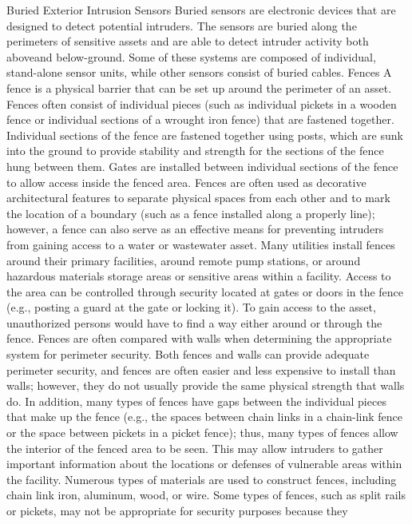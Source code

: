 \documentclass{article}
\begin{document}
Buried Exterior Intrusion Sensors Buried sensors are electronic devices
that are designed to detect potential intruders. The sensors are buried
along the perimeters of sensitive assets and are able to detect intruder
activity both aboveand below-ground. Some of these systems are composed
of individual, stand-alone sensor units, while other sensors consist of
buried cables. Fences A fence is a physical barrier that can be set up
around the perimeter of an asset. Fences often consist of individual
pieces (such as individual pickets in a wooden fence or individual
sections of a wrought iron fence) that are fastened together. Individual
sections of the fence are fastened together using posts, which are sunk
into the ground to provide stability and strength for the sections of
the fence hung between them. Gates are installed between individual
sections of the fence to allow access inside the fenced area. Fences are
often used as decorative architectural features to separate physical
spaces from each other and to mark the location of a boundary (such as a
fence installed along a properly line); however, a fence can also serve
as an effective means for preventing intruders from gaining access to a
water or wastewater asset. Many utilities install fences around their
primary facilities, around remote pump stations, or around hazardous
materials storage areas or sensitive areas within a facility. Access to
the area can be controlled through security located at gates or doors in
the fence (e.g., posting a guard at the gate or locking it). To gain
access to the asset, unauthorized persons would have to find a way
either around or through the fence. Fences are often compared with walls
when determining the appropriate system for perimeter security. Both
fences and walls can provide adequate perimeter security, and fences are
often easier and less expensive to install than walls; however, they do
not usually provide the same physical strength that walls do. In
addition, many types of fences have gaps between the individual pieces
that make up the fence (e.g., the spaces between chain links in a
chain-link fence or the space between pickets in a picket fence); thus,
many types of fences allow the interior of the fenced area to be seen.
This may allow intruders to gather important information about the
locations or defenses of vulnerable areas within the facility. Numerous
types of materials are used to construct fences, including chain link
iron, aluminum, wood, or wire. Some types of fences, such as split rails
or pickets, may not be appropriate for security purposes because they
\end{document}

